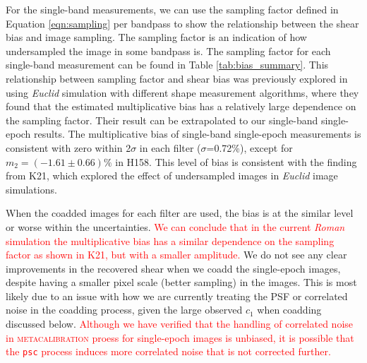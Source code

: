 \documentclass[fleqn,usenatbib]{mnras}
\begin{document}
For the single-band measurements, we can use the sampling factor defined in Equation \ref{eqn:sampling} per bandpass to show the relationship between the shear bias and image sampling. The sampling factor is an indication of how undersampled the image in some bandpass is. The sampling factor for each single-band measurement can be found in Table \ref{tab:bias_summary}. This relationship between sampling factor and shear bias was previously explored in \citealt{2021MNRAS.502.4048K} using \emph{Euclid} simulation with different shape measurement algorithms, where they found that the estimated multiplicative bias has a relatively large dependence on the sampling factor. Their result can be extrapolated to our single-band single-epoch results. The multiplicative bias of single-band single-epoch measurements is consistent with zero within 2$\sigma$ in each filter ($\sigma$=0.72\%), except for $m_{2}=(-1.61\pm0.66)\%$ in H158. This level of bias is consistent with the finding from K21, which explored the effect of undersampled images in \emph{Euclid} image simulations. 


When the coadded images for each filter are used, the bias is at the similar level or worse within the uncertainties. \textcolor{red}{We can conclude that in the current \emph{Roman} simulation the multiplicative bias has a similar dependence on the sampling factor as shown in K21, but with a smaller amplitude.} We do not see any clear improvements in the recovered shear when we coadd the single-epoch images, despite having a smaller pixel scale (better sampling) in the images. This is most likely due to an issue with how we are currently treating the PSF or correlated noise in the coadding process, given the large observed $c_1$ when coadding discussed below. \textcolor{red}{Although we have verified that the handling of correlated noise in \textsc{metacalibration} proess for single-epoch images is unbiased, it is possible that the \texttt{psc} process induces more correlated noise that is not corrected further. }
\end{document}
